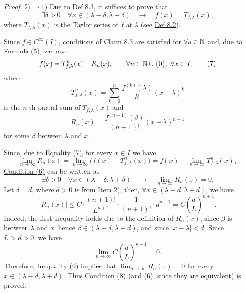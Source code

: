 \begin{proof}
$2)\Rightarrow1)$ Due to \hyperref[def:8.3]{Def 8.3}, it suffices to prove that
\[
\exists\delta>0\quad \forall x\in(\lambda-\delta,\lambda+\delta)
\quad\to\quad f(x)=T_{f,\lambda}(x),
\tag{6}\label{eq:8:6:1}
\]
where $T_{f,\lambda}(x)$ is the Taylor series of $f$ at $\lambda$ (see \hyperref[def:8.2]{Def 8.2}).

Since $f\in C^\infty(I)$, conditions of \hyperref[claim:8.3]{Claim 8.3} are satisfied for $\forall n\in\mathbb{N}$ and, due to \hyperref[eq:8:5:1]{Formula (5)}, we have
\[
f(x)=T_{f,\lambda}^{n}(x)+R_n(x),
\qquad \forall n\in\mathbb{N}\cup\{0\},\ \forall x\in I,
\tag{7}\label{eq:8:7:1}
\]
where
\[
T_{f,\lambda}^{n}(x)=\sum_{k=0}^{n}\frac{f^{(k)}(\lambda)}{k!}(x-\lambda)^k
\]
is the $n$-th partial sum of $T_{f,\lambda}(x)$ and
\[
R_n(x)=\frac{f^{(n+1)}(\beta)}{(n+1)!}(x-\lambda)^{n+1}
\]
for some $\beta$ between $\lambda$ and $x$.

Since, due to \hyperref[eq:8:7:1]{Equality (7)}, for every $x\in I$ we have
\[
\lim_{n\to\infty}R_n(x)
=\lim_{n\to\infty}\bigl(f(x)-T_{f,\lambda}^{n}(x)\bigr)
=f(x)-\lim_{n\to\infty}T_{f,\lambda}^{n}(x),
\]
\hyperref[eq:8:6:1]{Condition (6)} can be written as
\[
\exists\delta>0\quad \forall x\in(\lambda-\delta,\lambda+\delta)
\quad\to\quad \lim_{n\to\infty}R_n(x)=0.
\tag{8}\label{eq:8:8:1}
\]
Let $\delta=d$, where $d>0$ is from \hyperref[item:claim:8.4:2]{Item 2)}, then, $\forall x\in(\lambda-d,\lambda+d)$, we have
\[
|R_n(x)|
\leq C\cdot\frac{(n+1)!}{L^{n+1}}\cdot\frac{1}{(n+1)!}\cdot d^{n+1}
=C\left(\frac{d}{L}\right)^{n+1}.
\tag{9}\label{eq:8:9:1}
\]
Indeed, the first inequality holds due to the definition of $R_n(x)$, since $\beta$ is between $\lambda$ and $x$, hence $\beta\in(\lambda-d,\lambda+d)$, and since $|x-\lambda|<d$.
Since $L>d>0$, we have
\[
\lim_{n\to\infty}C\left(\frac{d}{L}\right)^{n+1}=0.
\]
Therefore, \hyperref[eq:8:9:1]{Inequality (9)} implies that $\lim_{n\to\infty}R_n(x)=0$ for every $x\in(\lambda-d,\lambda+d)$. Thus \hyperref[eq:8:8:1]{Condition (8)} (and \hyperref[eq:8:6:1]{(6)}, since they are equivalent) is proved.


\end{proof}
